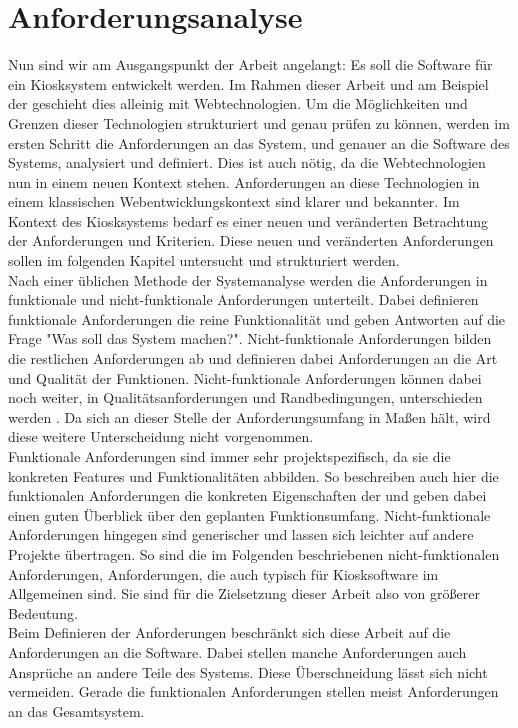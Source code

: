 \chapter{Anforderungsanalyse}
\label{sec:anforderungen}

Nun sind wir am Ausgangspunkt der Arbeit angelangt: Es soll die Software für ein Kiosksystem
entwickelt werden. Im Rahmen dieser Arbeit und am Beispiel der \shst{}
geschieht dies alleinig mit Webtechnologien. Um die Möglichkeiten und Grenzen dieser Technologien
strukturiert und genau prüfen zu können, werden im ersten Schritt die Anforderungen an das System,
und genauer an die Software des Systems, analysiert und definiert. 
Dies ist auch nötig, da die Webtechnologien nun in einem neuen Kontext stehen. Anforderungen an diese
Technologien in einem klassischen Webentwicklungskontext sind klarer und bekannter. Im Kontext
des Kiosksystems bedarf es einer neuen und veränderten Betrachtung der Anforderungen und Kriterien.
Diese neuen und veränderten Anforderungen sollen im folgenden Kapitel untersucht und strukturiert
werden.\\

Nach einer üblichen Methode der Systemanalyse werden die Anforderungen in funktionale und 
nicht-funktionale Anforderungen unterteilt. Dabei definieren funktionale Anforderungen die 
reine Funktionalität und geben Antworten 
auf die Frage "Was soll das System machen?". Nicht-funktionale Anforderungen bilden die
restlichen Anforderungen ab und definieren dabei Anforderungen an die Art und Qualität der
Funktionen. Nicht-funktionale Anforderungen können dabei noch weiter, in Qualitätsanforderungen 
und Randbedingungen, unterschieden werden \cite[S.20 f.]{systemanalyse}. 
Da sich an dieser Stelle der Anforderungsumfang in Maßen hält, wird diese weitere Unterscheidung
nicht vorgenommen.\\
Funktionale Anforderungen sind immer sehr projektspezifisch, da sie die konkreten Features
und Funktionalitäten abbilden. So beschreiben auch hier die funktionalen Anforderungen die konkreten
Eigenschaften der \shst{} und geben dabei einen guten Überblick über den geplanten Funktionsumfang.
Nicht-funktionale Anforderungen hingegen sind generischer und lassen sich leichter auf andere Projekte
übertragen. So sind die im Folgenden beschriebenen nicht-funktionalen Anforderungen, Anforderungen, die
auch typisch für Kiosksoftware im Allgemeinen sind. Sie sind für die Zielsetzung dieser Arbeit also von 
größerer Bedeutung.\\
Beim Definieren der Anforderungen beschränkt sich diese Arbeit auf die Anforderungen an die Software.
Dabei stellen manche Anforderungen auch Ansprüche an andere Teile des Systems. Diese Überschneidung
lässt sich nicht vermeiden. Gerade die funktionalen Anforderungen stellen meist Anforderungen an das 
Gesamtsystem.\\ 


